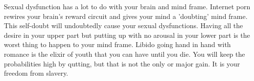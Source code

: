 \documentclass[easypeasy]{subfiles}
\begin{document}
Sexual dysfunction has a lot to do with your brain and mind frame. Internet porn rewires your brain's reward circuit and gives your mind a 'doubting' mind frame. This self-doubt will undoubtedly cause your sexual dysfunctions. Having all the desire in your upper part but putting up with no arousal in your lower part is the worst thing to happen to your mind frame. Libido going hand in hand with romance is the elixir of youth that you can have until you die. You will keep the probabilities high by qutting, but that is not the only or major gain. It is your freedom from slavery.
\end{document}
